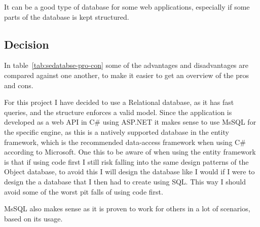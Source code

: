 It can be a good type of database for some web applications, especially if some parts of the database is kept structured.


\subsection{Decision }
\label{sub:database_decision}
In table~\ref{tab:sedatabse-pro-con} some of the advantages and disadvantages are compared against one another, to make it easier to get an overview of the pros and cons.

For this project I have decided to use a Relational database, as it has fast queries, and the structure enforces a valid model. Since the application is developed as a web API in C\# using ASP.NET it makes sense to use MsSQL for the specific engine, as this is a natively supported database in the entity framework, which is the recommended data-access framework when using C\# according to Microsoft\cite{entity:microsoft}. One this to be aware of when using the entity framework is that if using code first I still risk falling into the same design patterns of the Object database, to avoid this I will design the database like I would if I were to design the a database that I then had to create using SQL. This way I should avoid some of the worst pit falls of using code first.

MsSQL also makes sense as it is proven to work for others in a lot of scenarios, based on its usage\cite{obdms:gartner}.

\begin{table}[h]
  \caption{Pros and cons of different types of databases}
  \label{tab:sedatabse-pro-con}
\end{table}

